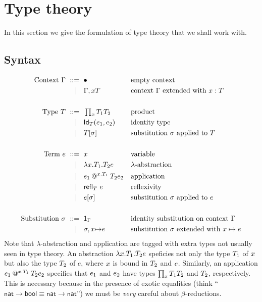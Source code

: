 \section{Type theory}
\label{sec:type-theory}

In this section we give the formulation of type theory that we shall work with.

\subsection{Syntax}
\label{sec:syntax}

\begin{align*}
  \text{Context $\Gamma$}
    \ \mathrel{{:}{:}{=}}\    {}& \bullet                         && \text{empty context} \\
    \ \mid\ \  {}& \Gamma, x{T}            && \text{context $\Gamma$ extended with $x : T$} \\
  \\
  \text{Type $T$}
    \ \mathrel{{:}{:}{=}}\    {}& \mathop{\textstyle\prod_{x}}{T_1} T_2               && \text{product}\\
    \ \mid\ \  {}& \mathsf{Id}_{T}(e_1,e_2)               && \text{identity type} \\
    \ \mid\ \  {}& T[\sigma]                  && \text{substitution $\sigma$ applied to $T$} \\
  \\
  \text{Term $e$}
    \ \mathrel{{:}{:}{=}}\    {}& x                                && \text{variable} \\
    \ \mid\ \  {}& \lambda x . T_1 .{T_2} e           && \text{$\lambda$-abstraction} \\
    \ \mid\ \  {}& e_1\mathbin{@^{x.T_1}} T_2{e_2}  && \text{application} \\
    \ \mid\ \  {}& {\mathsf{refl}_{T}}\  e                      && \text{reflexivity} \\
    \ \mid\ \  {}& e[\sigma]                  && \text{substitution $\sigma$ applied to $e$} \\
  \\
  \text{Substitution $\sigma$}
    \ \mathrel{{:}{:}{=}}\    {}& \mathsf{1}_{\Gamma}                   && \text{identity substitution on context $\Gamma$} \\
    \ \mid\ \  {}& \sigma,x{\mapsto}e           && \text{substitution $\sigma$ extended with $x \mapsto e$}
\end{align*}
%
Note that $\lambda$-abstraction and application are tagged with extra types not usually
seen in type theory. An abstraction $\lambda x . T_1 .{T_2} e$ speficies not only the type
$T_1$ of $x$ but also the type $T_2$ of $e$, where $x$ is bound in $T_2$ and $e$.
Similarly, an application $e_1\mathbin{@^{x.T_1}} T_2{e_2}$ specifies that $e_1$ and
$e_2$ have types $\mathop{\textstyle\prod_{x}}{T_1} T_2$ and $T_2$, respectively. This is necessary
because in the presence of exotic equalities (think ``$\mathsf{nat} \to \mathsf{bool}
\equiv \mathsf{nat} \to \mathsf{nat}$'') we must be \emph{very} careful about
$\beta$-reductions.


